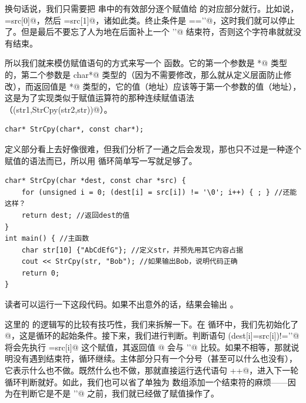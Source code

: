 换句话说，我们只需要把 \lstinline@src@ 串中的有效部分逐个赋值给 \lstinline@dest@ 的对应部分就行。比如说，\lstinline@dest[0]=src[0]@，然后 \lstinline@dest[1]=src[1]@，诸如此类。终止条件是 \lstinline@src[i]=='\0'@，这时我们就可以停止了。但是最后不要忘了人为地在后面补上一个 \lstinline@'\0'@ 结束符，否则这个字符串就就没有结束。\par
所以我们就来模仿赋值语句的方式来写一个 \lstinline@StrCpy@ 函数。它的第一个参数是 \lstinline@char*@ 类型的，第二个参数是 \lstinline@const char*@ 类型的（因为不需要修改，那么就从定义层面防止修改），而返回值是 \lstinline@char*@ 类型的，它的值（地址）应该等于第一个参数的值（地址），这是为了实现类似于赋值运算符的那种连续赋值语法（\lstinline@StrCpy(str1,StrCpy(str2,str))@）。\par
\begin{lstlisting}
char* StrCpy(char*, const char*);
\end{lstlisting}
定义部分看上去好像很难，但我们分析了一通之后会发现，那也只不过是一种逐个赋值的语法而已，所以用 \lstinline@for@ 循环简单写一写就足够了。
\begin{lstlisting}
char* StrCpy(char *dest, const char *src) {
    for (unsigned i = 0; (dest[i] = src[i]) != '\0'; i++) { ; } //还能这样？
    return dest; //返回dest的值
}
int main() { //主函数
    char str[10] {"AbCdEfG"}; //定义str，并预先用其它内容占据
    cout << StrCpy(str, "Bob"); //如果输出Bob，说明代码正确
    return 0;
}
\end{lstlisting}
读者可以运行一下这段代码。如果不出意外的话，结果会输出 \lstinline@Bob@。\par
这里的 \lstinline@StrCpy@ 的逻辑写的比较有技巧性，我们来拆解一下。在 \lstinline@for@ 循环中，我们先初始化了 @，这是循环的起始条件。接下来，我们进行判断。判断语句 \lstinline@(dest[i]=src[i])!='\0'@ 将会先执行 \lstinline@dest[i]=src[i]@ 这个赋值，其返回值 \lstinline@dest[i]@ 会与 \lstinline@'\0'@ 比较。如果不相等，那就说明没有遇到结束符，循环继续。主体部分只有一个分号（甚至可以什么也没有），它表示什么也不做。既然什么也不做，那就直接运行迭代语句 \lstinline@i++@，进入下一轮循环判断就好。如此，我们也可以省了单独为 \lstinline@dest@ 数组添加一个结束符的麻烦——因为在判断它是不是 \lstinline@'\0'@ 之前，我们就已经做了赋值操作了。\par
